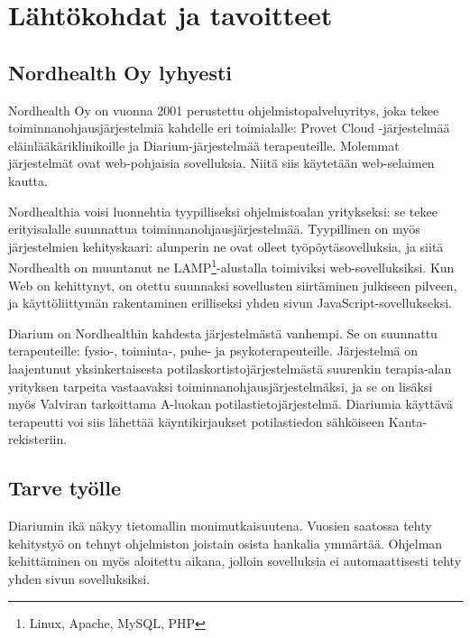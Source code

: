 \hypertarget{luxe4htuxf6kohdat-ja-tavoitteet}{%
\chapter{Lähtökohdat ja
tavoitteet}\label{luxe4htuxf6kohdat-ja-tavoitteet}}

\hypertarget{nordhealth-oy-lyhyesti}{%
\section{Nordhealth Oy lyhyesti}\label{nordhealth-oy-lyhyesti}}

Nordhealth Oy on vuonna 2001 perustettu ohjelmistopalveluyritys, joka
tekee toiminnanohjausjärjestelmiä kahdelle eri toimialalle: Provet
Cloud\cite{ProvetCloudHomepage} -järjestelmää eläinlääkäriklinikoille ja
Diarium-järjestelmää\cite{DiariumHomepage} terapeuteille. Molemmat
järjestelmät ovat web-pohjaisia sovelluksia. Niitä siis käytetään
web-selaimen kautta.

Nordhealthia voisi luonnehtia tyypilliseksi ohjelmistoalan yritykseksi:
se tekee erityisalalle suunnattua toiminnanohjausjärjestelmää.
Tyypillinen on myös järjestelmien kehityskaari: alunperin ne ovat olleet
työpöytäsovelluksia, ja siitä Nordhealth on muuntanut ne LAMP\footnote{Linux,
  Apache, MySQL, PHP}-alustalla toimiviksi web-sovelluksiksi. Kun Web on
kehittynyt, on otettu suunnaksi sovellusten siirtäminen julkiseen
pilveen, ja käyttöliittymän rakentaminen erilliseksi yhden sivun
JavaScript-sovellukseksi.

Diarium on Nordhealthin kahdesta järjestelmästä vanhempi. Se on
suunnattu terapeuteille: fysio-, toiminta-, puhe- ja psykoterapeuteille.
Järjestelmä on laajentunut yksinkertaisesta
potilaskortistojärjestelmästä suurenkin terapia-alan yrityksen tarpeita
vastaavaksi toiminnanohjausjärjestelmäksi, ja se on lisäksi myös
Valviran tarkoittama A-luokan potilastietojärjestelmä. Diariumia
käyttävä terapeutti voi siis lähettää käyntikirjaukset potilastiedon
sähköiseen Kanta-rekisteriin.

\hypertarget{tarve-tyuxf6lle}{%
\section{Tarve työlle}\label{tarve-tyuxf6lle}}

Diariumin ikä näkyy tietomallin monimutkaisuutena. Vuosien saatossa
tehty kehitystyö on tehnyt ohjelmiston joistain osista hankalia
ymmärtää. Ohjelman kehittäminen on myös aloitettu aikana, jolloin
sovelluksia ei automaattisesti tehty yhden sivun sovelluksiksi.

